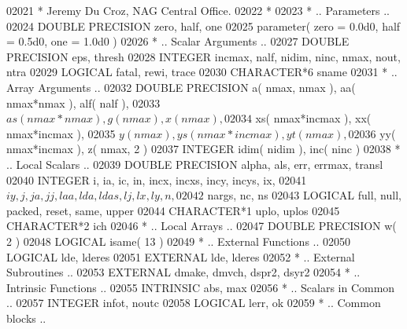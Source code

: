 \begin{DoxyCode}
02021 \textcolor{comment}{*     Jeremy Du Croz, NAG Central Office.}
02022 \textcolor{comment}{*}
02023 \textcolor{comment}{*     .. Parameters ..}
02024       \textcolor{keywordtype}{DOUBLE PRECISION}   zero, half, one
02025       parameter( zero = 0.0d0, half = 0.5d0, one = 1.0d0 )
02026 \textcolor{comment}{*     .. Scalar Arguments ..}
02027       \textcolor{keywordtype}{DOUBLE PRECISION}   eps, thresh
02028       \textcolor{keywordtype}{INTEGER}            incmax, nalf, nidim, ninc, nmax, nout, ntra
02029       \textcolor{keywordtype}{LOGICAL}            fatal, rewi, trace
02030       \textcolor{keywordtype}{CHARACTER*6}        sname
02031 \textcolor{comment}{*     .. Array Arguments ..}
02032       \textcolor{keywordtype}{DOUBLE PRECISION}   a( nmax, nmax ), aa( nmax*nmax ), alf( nalf ),
02033      $                   as( nmax*nmax ), g( nmax ), x( nmax ),
02034      $                   xs( nmax*incmax ), xx( nmax*incmax ),
02035      $                   y( nmax ), ys( nmax*incmax ), yt( nmax ),
02036      $                   yy( nmax*incmax ), z( nmax, 2 )
02037       \textcolor{keywordtype}{INTEGER}            idim( nidim ), inc( ninc )
02038 \textcolor{comment}{*     .. Local Scalars ..}
02039       \textcolor{keywordtype}{DOUBLE PRECISION}   alpha, als, err, errmax, transl
02040       \textcolor{keywordtype}{INTEGER}            i, ia, ic, in, incx, incxs, incy, incys, ix,
02041      $                   iy, j, ja, jj, laa, lda, ldas, lj, lx, ly, n,
02042      $                   nargs, nc, ns
02043       \textcolor{keywordtype}{LOGICAL}            full, null, packed, reset, same, upper
02044       \textcolor{keywordtype}{CHARACTER*1}        uplo, uplos
02045       \textcolor{keywordtype}{CHARACTER*2}        ich
02046 \textcolor{comment}{*     .. Local Arrays ..}
02047       \textcolor{keywordtype}{DOUBLE PRECISION}   w( 2 )
02048       \textcolor{keywordtype}{LOGICAL}            isame( 13 )
02049 \textcolor{comment}{*     .. External Functions ..}
02050       \textcolor{keywordtype}{LOGICAL}            lde, lderes
02051       \textcolor{keywordtype}{EXTERNAL}           lde, lderes
02052 \textcolor{comment}{*     .. External Subroutines ..}
02053       \textcolor{keywordtype}{EXTERNAL}           dmake, dmvch, dspr2, dsyr2
02054 \textcolor{comment}{*     .. Intrinsic Functions ..}
02055       \textcolor{keywordtype}{INTRINSIC}          abs, max
02056 \textcolor{comment}{*     .. Scalars in Common ..}
02057       \textcolor{keywordtype}{INTEGER}            infot, noutc
02058       \textcolor{keywordtype}{LOGICAL}            lerr, ok
02059 \textcolor{comment}{*     .. Common blocks ..}

\end{DoxyCode}
